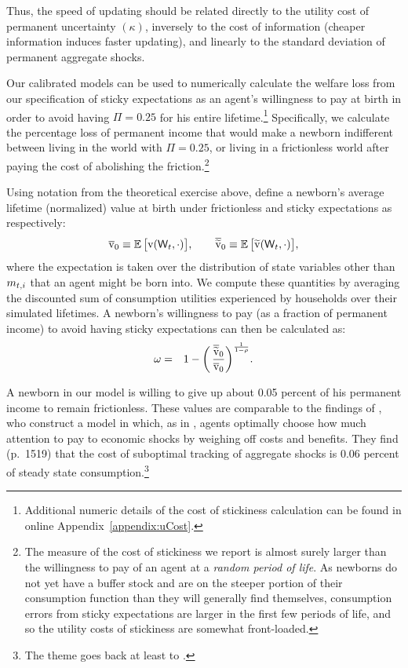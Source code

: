 Thus, the speed of updating should be related directly to the utility cost of permanent uncertainty $(\kappa)$, inversely to the cost of information (cheaper information induces faster updating), and linearly to the standard deviation of permanent aggregate shocks.

Our calibrated models can be used to numerically calculate the welfare loss from our specification of sticky expectations as an agent's willingness to pay at birth in order to avoid having $\Pi=0.25$ for his entire lifetime.\footnote{Additional numeric details of the cost of stickiness calculation can be found in online Appendix~\ref{appendix:uCost}.}  Specifically, we calculate the percentage loss of permanent income that would make a newborn indifferent between living in the world with $\Pi=0.25$, or living in a frictionless world after paying the cost of abolishing the friction.\footnote{The measure of the cost of stickiness we report is almost surely larger than the willingness to pay of an agent at a \textit{random period of life}.  As newborns do not yet have a buffer stock and are on the steeper portion of their consumption function than they will generally find themselves, consumption errors from sticky expectations are larger in the first few periods of life, and so the utility costs of stickiness are somewhat front-loaded.}

Using notation from the theoretical exercise above, define a newborn's average lifetime (normalized) value at birth under frictionless and sticky expectations as respectively:
\begin{equation*}
\overline{\mathrm{v}}_0 \equiv \operatorname{\mathbb{E}} \big[ \mathrm{v}(\mathsf{W}_t,\cdot)\big], \qquad \overline{\widetilde{\mathrm{v}}}_0 \equiv \operatorname{\mathbb{E}} \big[ \widetilde{\mathrm{v}}(\mathsf{W}_t,\cdot)\big],
\end{equation*}
where the expectation is taken over the distribution of state variables other than $m_{t,i}$ that an agent might be born into.  We compute these quantities by averaging the discounted sum of consumption utilities experienced by households over their simulated lifetimes.  A newborn's willingness to pay (as a fraction of permanent income) to avoid having sticky expectations can then be calculated as:
\begin{eqnarray}\label{eq:WTP}
\omega & = & 1 - \bigg(\,\frac{\overline{\widetilde{\mathrm{v}}}_0}{\overline{\mathrm{v}}_0} \bigg)^{\frac{1}{1-\rho}}.
\end{eqnarray}

A newborn in our model is willing to give up about 0.05 percent of his permanent income to remain frictionless.  These values are comparable to the findings of \cite{mackWiedREStud15}, who construct a model in which, as in \cite{reis:inattentive}, agents optimally choose how much attention to pay to economic shocks by weighing off costs and benefits.  They find (p.\ 1519) that the cost of suboptimal tracking of aggregate shocks is 0.06 percent of steady state consumption.\footnote{The theme goes back at least to \cite{cochrane_nearRational}.}

